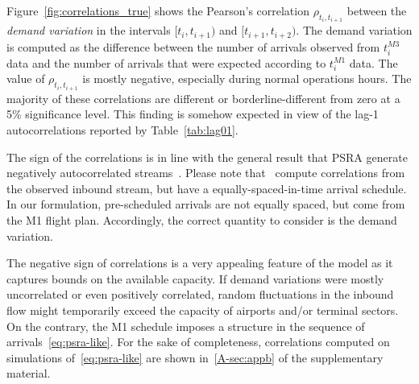 \documentclass[]{elsarticle}
\begin{document}
Figure~\ref{fig:correlations_true} shows the Pearson's correlation \(\rho_{t_i, t_{i+1}}\) between the \emph{demand variation} in the intervals \([t_i, t_{i+1})\) and \([t_{i+1}, t_{i+2})\).
The demand variation is computed as the difference between the number of arrivals observed from \(t^{M3}_i\) data and the number of arrivals that were expected according to \(t^{M1}_i\) data.
The value of \(\rho_{t_i, t_{i+1}}\) is mostly negative, especially during normal operations hours.
The majority of these correlations are different or borderline-different from zero at a 5\% significance level.
This finding is somehow expected in view of the lag-1 autocorrelations reported by Table~\ref{tab:lag01}.
\begin{kpt}
	The sign of the correlations is in line with the general result that \ac{PSRA} generate negatively autocorrelated streams~\citep{guadagni2011queueing}.
  Please note that~\citet{guadagni2011queueing} compute correlations from the observed inbound stream, but have a equally-spaced-in-time arrival schedule.  In our formulation, pre-scheduled arrivals are not equally spaced, but come from the M1 flight plan.
  Accordingly, the correct quantity to consider is the demand variation.
\end{kpt}


  The negative sign of correlations is a very appealing feature of the model as it captures bounds on the available capacity.
  If demand variations were mostly uncorrelated or even positively correlated, random fluctuations in the inbound flow might temporarily exceed the capacity of airports and/or terminal sectors.
  On the contrary, the M1 schedule imposes a structure in the sequence of arrivals~\eqref{eq:psra-like}.
For the sake of completeness, correlations computed on simulations of~\ref{eq:psra-like} are shown in~\ref{A-sec:appb} of the supplementary material.
\end{document}
